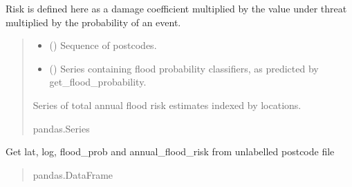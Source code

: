 \documentclass[letterpaper,10pt,english]{sphinxmanual}
\begin{document}
\begin{fulllineitems}
\begin{fulllineitems}
\label{\detokenize{index:flood_tool.Tool.get_annual_flood_risk}}
\pysigstartsignatures
{}
\pysigstopsignatures
\sphinxAtStartPar
Risk is defined here as a damage coefficient multiplied by the
value under threat multiplied by the probability of an event.
\begin{quote}\begin{description}
\begin{itemize}
\item {} 
\sphinxAtStartPar
{} () \textendash{} Sequence of postcodes.

\item {} 
\sphinxAtStartPar
{} (\sphinxstyleliteralemphasis{\sphinxupquote{ (}}\sphinxstyleliteralemphasis{\sphinxupquote{)}}) \textendash{} Series containing flood probability classifiers, as
predicted by get\_flood\_probability.

\end{itemize}

\sphinxAtStartPar
Series of total annual flood risk estimates indexed by locations.

\sphinxAtStartPar
pandas.Series

\end{description}\end{quote}

\end{fulllineitems}


\begin{fulllineitems}
\label{\detokenize{index:flood_tool.Tool.get_combined_data}}
\pysigstartsignatures
{}
\pysigstopsignatures
\sphinxAtStartPar
Get lat, log, flood\_prob and annual\_flood\_risk from unlabelled
postcode file
\begin{quote}\begin{description}
\sphinxAtStartPar
pandas.DataFrame


\end{description}
\end{quote}
\end{fulllineitems}
\end{fulllineitems}
\end{document}
